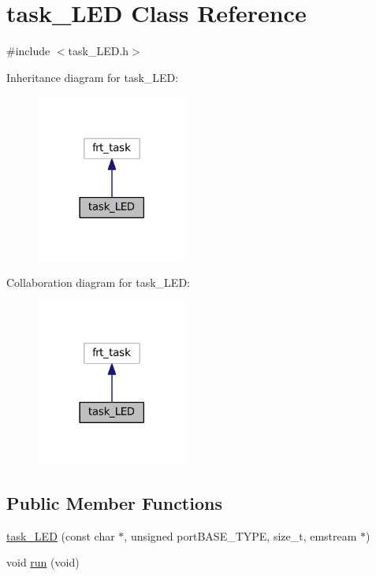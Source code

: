 \hypertarget{classtask__LED}{}\section{task\+\_\+\+L\+ED Class Reference}
\label{classtask__LED}


{\ttfamily \#include $<$task\+\_\+\+L\+E\+D.\+h$>$}



Inheritance diagram for task\+\_\+\+L\+ED\+:
\nopagebreak
\begin{figure}[H]
\begin{center}
\leavevmode
\includegraphics[width=141pt]{classtask__LED__inherit__graph}
\end{center}
\end{figure}


Collaboration diagram for task\+\_\+\+L\+ED\+:
\nopagebreak
\begin{figure}[H]
\begin{center}
\leavevmode
\includegraphics[width=141pt]{classtask__LED__coll__graph}
\end{center}
\end{figure}
\subsection*{Public Member Functions}
\begin{DoxyCompactItemize}
\item 
\mbox{\hyperlink{classtask__LED_a5479d56922008471ea3a0c52ce0b6d77}{task\+\_\+\+L\+ED}} (const char $\ast$, unsigned port\+B\+A\+S\+E\+\_\+\+T\+Y\+PE, size\+\_\+t, emstream $\ast$)
\item 
void \mbox{\hyperlink{classtask__LED_a913e9bbfc8ee771f558285f4ab2dc56c}{run}} (void)
\end{DoxyCompactItemize}
